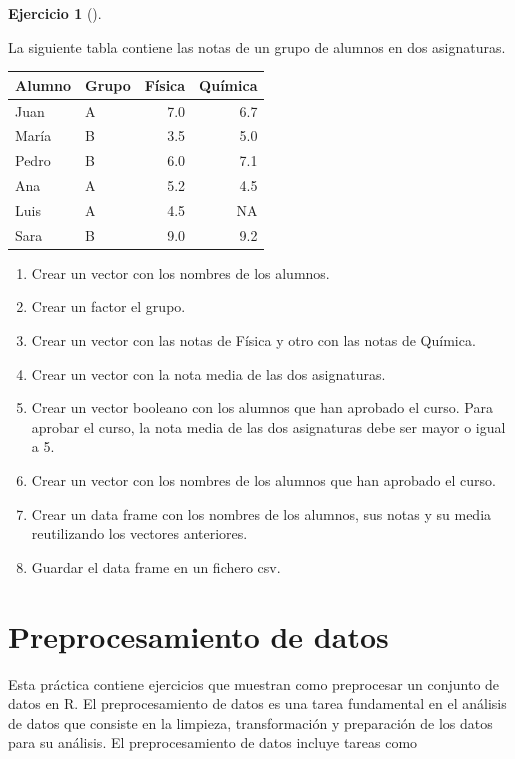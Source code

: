 \documentclass[
  spanish,
  a4paper,
]{scrreport}
\theoremstyle{definition}
\newtheorem{exercise}{Ejercicio}[chapter]
\theoremstyle{remark}
\begin{document}
\begin{exercise}[]\protect\hypertarget{exr-vectores-2}{}\label{exr-vectores-2}

La siguiente tabla contiene las notas de un grupo de alumnos en dos
asignaturas.

\begin{longtable}[]{@{}llrr@{}}
\toprule\noalign{}
Alumno & Grupo & Física & Química \\
\midrule\noalign{}
\endhead
\bottomrule\noalign{}
\endlastfoot
Juan & A & 7.0 & 6.7 \\
María & B & 3.5 & 5.0 \\
Pedro & B & 6.0 & 7.1 \\
Ana & A & 5.2 & 4.5 \\
Luis & A & 4.5 & NA \\
Sara & B & 9.0 & 9.2 \\
\end{longtable}

\begin{enumerate}
\def\labelenumi{\alph{enumi}.}
\item
  Crear un vector con los nombres de los alumnos.
\item
  Crear un factor el grupo.
\item
  Crear un vector con las notas de Física y otro con las notas de
  Química.
\item
  Crear un vector con la nota media de las dos asignaturas.
\item
  Crear un vector booleano con los alumnos que han aprobado el curso.
  Para aprobar el curso, la nota media de las dos asignaturas debe ser
  mayor o igual a 5.
\item
  Crear un vector con los nombres de los alumnos que han aprobado el
  curso.
\item
  Crear un data frame con los nombres de los alumnos, sus notas y su
  media reutilizando los vectores anteriores.
\item
  Guardar el data frame en un fichero csv.
\end{enumerate}

\end{exercise}


\chapter{Preprocesamiento de datos}\label{preprocesamiento-de-datos}

Esta práctica contiene ejercicios que muestran como preprocesar un
conjunto de datos en R. El preprocesamiento de datos es una tarea
fundamental en el análisis de datos que consiste en la limpieza,
transformación y preparación de los datos para su análisis. El
preprocesamiento de datos incluye tareas como
\end{document}
